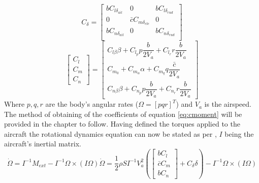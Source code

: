 \begin{equation}
C_\delta = 
\begin{bmatrix}
bC_{l\delta_{ail}} & 0 & bC_{l\delta_{rud}} \\
0 & \bar{c}C_{m\delta_{ele}} & 0 \\
bC_{n\delta_{ail}} & 0 & bC_{n\delta_{rud}}\\
\end{bmatrix}
\label{eq:cdelta}
\end{equation}
\begin{equation}
\begin{bmatrix}
C_l\\
C_m\\
C_n
\end{bmatrix} 
=
\begin{bmatrix}
C_{l\beta} \beta + C_{l_p} p \dfrac{b}{2V_a} + C_{l_r} r \dfrac{b}{2V_a}\\
C_{m_0} + C_{m_\alpha} \alpha + C_{m_q} q \dfrac{\bar{c}}{2V_a}\\
C_{n\beta} \beta + C_{n_p} p \dfrac{b}{2V_a} + C_{n_r} r \dfrac{b}{2V_a}
\end{bmatrix}
\label{eq:cmoment}
\end{equation}
Where $p, q, r$ are the body's angular rates ($\Omega = [p q r]^T$) and $V_a$ is the airspeed. The method of obtaining of the coefficients of equation \ref{eq:cmoment} will be provided in the chapter to follow. Having defined the torques applied to the aircraft the rotational dynamics equation can now be stated as per \cite{hector}, $I$ being the aircraft's inertial matrix.
\begin{subequations}
	\begin{equation}
		\dot{\Omega} = I^{-1} M_{ext} - I^{-1}\Omega \times (I\Omega)
	\end{equation}
	\begin{equation}
		\dot{\Omega} = 
		\dfrac{1}{2}\rho S I^{-1} V_a^2\left(
		\begin{bmatrix}
			bC_l\\
			\bar{c}C_m\\
			bC_n
		\end{bmatrix}
		+ C_\delta \delta\right)
		- I^{-1}\Omega \times (I\Omega)	
	\end{equation}

\label{eq:fast_dynamics}
\end{subequations}

